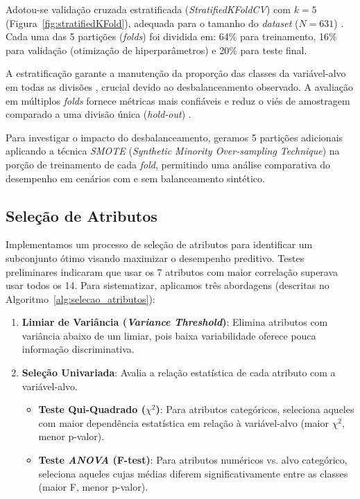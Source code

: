 \documentclass[12pt]{article}
\begin{document}
Adotou-se validação cruzada estratificada (\textit{StratifiedKFoldCV}) com $k = 5$ (Figura~\ref{fig:stratifiedKFold}), adequada para o tamanho do \textit{dataset} ($N=631$) \cite{Szeghalmy2023, CienciaDadosFund}. Cada uma das 5 partições (\textit{folds}) foi dividida em: 64\% para treinamento, 16\% para validação (otimização de hiperparâmetros) e 20\% para teste final.

A estratificação garante a manutenção da proporção das classes da variável-alvo em todas as divisões \cite{Szeghalmy2023}, crucial devido ao desbalanceamento observado. A avaliação em múltiplos \textit{folds} fornece métricas mais confiáveis e reduz o viés de amostragem comparado a uma divisão única (\textit{hold-out}) \cite{CienciaDadosFund}.

Para investigar o impacto do desbalanceamento, geramos 5 partições adicionais aplicando a técnica \textit{SMOTE} (\textit{Synthetic Minority Over-sampling Technique}) \cite{chawla2002smote} na porção de treinamento de cada \textit{fold}, permitindo uma análise comparativa do desempenho em cenários com e sem balanceamento sintético.

\subsection{Seleção de Atributos}

Implementamos um processo de seleção de atributos para identificar um subconjunto ótimo visando maximizar o desempenho preditivo. Testes preliminares indicaram que usar os 7 atributos com maior correlação superava usar todos os 14. Para sistematizar, aplicamos três abordagens (descritas no Algoritmo~\ref{alg:selecao_atributos}):

\begin{enumerate}
    \item \textbf{Limiar de Variância (\textit{Variance Threshold})}: Elimina atributos com variância abaixo de um limiar, pois baixa variabilidade oferece pouca informação discriminativa.
    \item \textbf{Seleção Univariada}: Avalia a relação estatística de cada atributo com a variável-alvo.
    \begin{itemize}
        \item \textbf{Teste Qui-Quadrado ($\chi^2$)}: Para atributos categóricos, seleciona aqueles com maior dependência estatística em relação à variável-alvo (maior $\chi^2$, menor p-valor).
        \item \textbf{Teste \textit{ANOVA} (F-test)}: Para atributos numéricos vs. alvo categórico, seleciona aqueles cujas médias diferem significativamente entre as classes (maior F, menor p-valor).
    \end{itemize}
\end{enumerate}
\end{document}
